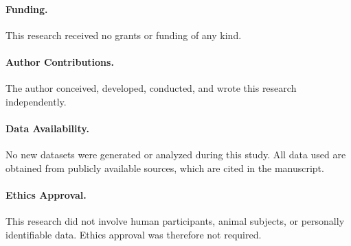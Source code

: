 \documentclass[pdflatex,sn-mathphys-num]{sn-jnl}%
\theoremstyle{thmstyleone}%
\theoremstyle{thmstyletwo}%
\theoremstyle{thmstylethree}%
\begin{document}
\paragraph{Funding.}
This research received no grants or funding of any kind.

\paragraph{Author Contributions.}
The author conceived, developed, conducted, and wrote this research independently.

\paragraph{Data Availability.}
No new datasets were generated or analyzed during this study. All data used are obtained from publicly available sources, which are cited in the manuscript.

\paragraph{Ethics Approval.}
This research did not involve human participants, animal subjects, or personally identifiable data. Ethics approval was therefore not required.



\end{document}
